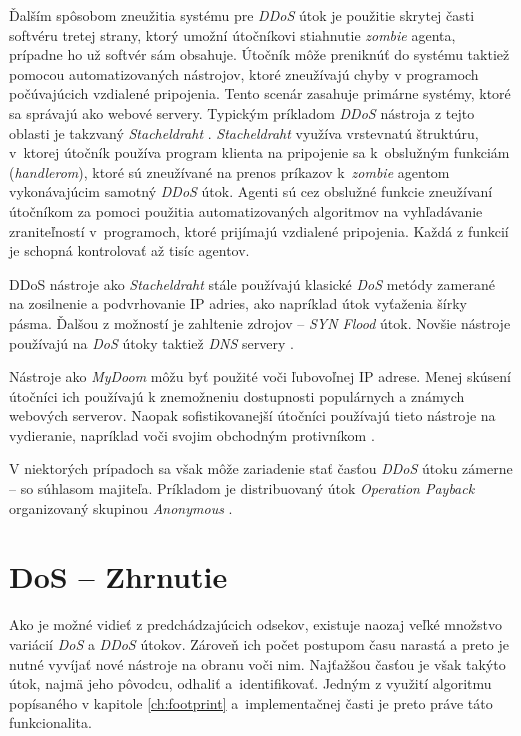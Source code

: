 \documentclass[
  printed, %
  table,   %
  lof,     %
  nolot,   %
  nocover
]{fithesis3}
\begin{document}
Ďalším spôsobom zneužitia systému pre \textit{DDoS} útok je použitie skrytej časti softvéru tretej
strany, ktorý umožní útočníkovi stiahnutie \textit{zombie} agenta, prípadne ho už softvér sám obsahuje.
Útočník môže preniknúť do systému taktiež pomocou automatizovaných nástrojov, ktoré zneužívajú chyby v
programoch počúvajúcich vzdialené pripojenia. Tento scenár zasahuje primárne systémy, ktoré sa správajú
ako webové servery. Typickým príkladom \textit{DDoS} nástroja z tejto oblasti je takzvaný
\textit{Stacheldraht} \cite{Dittrich:DoST}. \textit{Stacheldraht} využíva vrstevnatú štruktúru, v~ktorej útočník používa
program klienta na pripojenie sa k~obslužným funkciám (\textit{handlerom}), ktoré sú zneužívané na prenos príkazov
k~\textit{zombie} agentom vykonávajúcim samotný \textit{DDoS} útok. Agenti sú cez 
obslužné funkcie
zneužívaní útočníkom za pomoci použitia automatizovaných algoritmov na vyhľadávanie zraniteľností
v~programoch, ktoré prijímajú vzdialené pripojenia. Každá z funkcií je schopná kontrolovať až 
tisíc
agentov. 

DDoS nástroje ako \textit{Stacheldraht} stále používajú klasické \textit{DoS} metódy zamerané na
zosilnenie a podvrhovanie IP adries, ako napríklad útok vyťaženia šírky pásma. Ďalšou z možností je
zahltenie zdrojov -- \textit{SYN Flood} útok. Novšie nástroje používajú na \textit{DoS} útoky taktiež
\textit{DNS} servery \cite{Dittrich:DoST}.

Nástroje ako \textit{MyDoom} môžu byť použité voči ľubovoľnej IP adrese. Menej skúsení útočníci ich
používajú k znemožneniu dostupnosti populárnych a známych webových serverov. Naopak sofistikovanejší
útočníci používajú tieto nástroje na vydieranie, napríklad voči svojim obchodným protivníkom \cite{Karami:2015:DoSaaS}.

V niektorých prípadoch sa však môže zariadenie stať časťou \textit{DDoS} útoku zámerne -- so súhlasom
majiteľa. Príkladom je distribuovaný útok \textit{Operation Payback} organizovaný skupinou
\textit{Anonymous} \cite{Leyden:2010:DoSaaS}.

\section{DoS -- Zhrnutie}
Ako je možné vidieť z predchádzajúcich odsekov, existuje naozaj veľké množstvo
variácií \textit{DoS} a \textit{DDoS} útokov. Zároveň ich počet postupom času
narastá a preto je nutné vyvíjať nové nástroje na obranu voči nim. Najťažšou časťou
je však takýto útok, najmä jeho pôvodcu, odhaliť a~identifikovať. Jedným z využití
algoritmu popísaného v kapitole \ref{ch:footprint} a~implementačnej časti je preto
práve táto funkcionalita.
\end{document}
